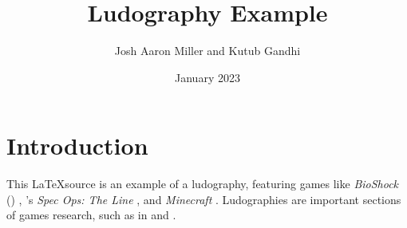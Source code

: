 \documentclass[sigconf]{acmart}
\title{Ludography Example}
\author{Josh Aaron Miller and Kutub Gandhi}
\date{January 2023}
\newcommand{\citegameprefix}{G}
\begin{document}
\maketitle

\section{Introduction}

This \LaTeX source is an example of a ludography, featuring games like \emph{BioShock} (\citeyear{bioshock}) , \citeauthor{specops}'s  \emph{Spec Ops: The Line} , and \emph{Minecraft} . Ludographies are important sections of games research, such as in \cite{gandhi_philosophy_2022} and \cite{poretski2022press}.



\renewcommand{\bibnumfmt}[1]{[\citegameprefix#1]}%

\renewcommand{\bibnumfmt}[1]{[#1]}%


\end{document}
